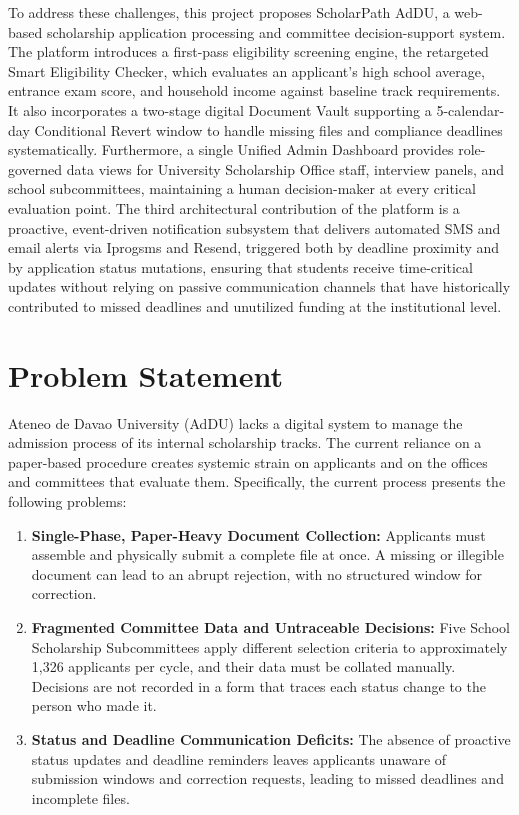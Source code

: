 To address these challenges, this project proposes ScholarPath AdDU, a web-based scholarship application processing and committee decision-support system. The platform introduces a first-pass eligibility screening engine, the retargeted Smart Eligibility Checker, which evaluates an applicant's high school average, entrance exam score, and household income against baseline track requirements. It also incorporates a two-stage digital Document Vault supporting a 5-calendar-day Conditional Revert window to handle missing files and compliance deadlines systematically. Furthermore, a single Unified Admin Dashboard provides role-governed data views for University Scholarship Office staff, interview panels, and school subcommittees, maintaining a human decision-maker at every critical evaluation point. The third architectural contribution of the platform is a proactive, event-driven notification subsystem that delivers automated SMS and email alerts via Iprogsms and Resend, triggered both by deadline proximity and by application status mutations, ensuring that students receive time-critical updates without relying on passive communication channels that have historically contributed to missed deadlines and unutilized funding at the institutional level.

\section{Problem Statement}

Ateneo de Davao University (AdDU) lacks a digital system to manage the admission process of its internal scholarship tracks. The current reliance on a paper-based procedure creates systemic strain on applicants and on the offices and committees that evaluate them. Specifically, the current process presents the following problems:

\begin{enumerate}
  \item \textbf{Single-Phase, Paper-Heavy Document Collection:} Applicants must assemble and physically submit a complete file at once. A missing or illegible document can lead to an abrupt rejection, with no structured window for correction.
  \item \textbf{Fragmented Committee Data and Untraceable Decisions:} Five School Scholarship Subcommittees apply different selection criteria to approximately 1,326 applicants per cycle, and their data must be collated manually. Decisions are not recorded in a form that traces each status change to the person who made it.
  \item \textbf{Status and Deadline Communication Deficits:} The absence of proactive status updates and deadline reminders leaves applicants unaware of submission windows and correction requests, leading to missed deadlines and incomplete files.
\end{enumerate}

